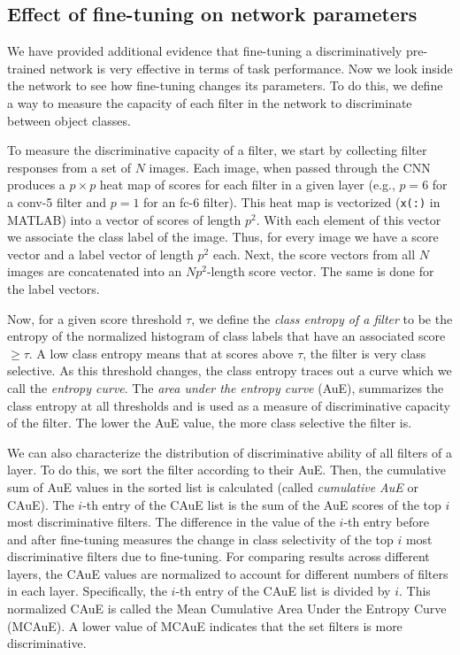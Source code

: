 \subsection{Effect of fine-tuning on network parameters}
\label{sub:fine-entropy}
We have provided additional evidence that fine-tuning a discriminatively pre-trained network is very effective in terms of task performance.
Now we look inside the network to see how fine-tuning changes its parameters.
To do this, we define a way to measure the capacity of each filter in the network to discriminate between object classes.

To measure the discriminative capacity of a filter, we start by collecting filter responses from a set of $N$ images.
Each image, when passed through the CNN produces a $p \times p$ heat map of scores for each filter in a given layer (e.g., $p = 6$ for a conv-5 filter and $p = 1$ for an fc-6 filter).
This heat map is vectorized (\texttt{x(:)} in MATLAB) into a vector of scores of length $p^2$. With each element of this vector we associate the class label of the image. 
Thus, for every image we have a score vector and a label vector of length $p^2$ each.
Next, the score vectors from all $N$ images are concatenated into an $Np^2$-length score vector.
The same is done for the label vectors.

Now, for a given score threshold $\tau$, we define the \emph{class entropy of a filter} to be the entropy of the normalized histogram of class labels that have an associated score $\geq \tau$.
A low class entropy means that at scores above $\tau$, the filter is very class selective.
As this threshold changes, the class entropy traces out a curve which we call the \emph{entropy curve}.
The \emph{area under the entropy curve} (AuE), summarizes the class entropy at all thresholds and is used as a measure of discriminative capacity of the filter. 
The lower the AuE value, the more class selective the filter is.

We can also characterize the distribution of discriminative ability of all filters of a layer.
To do this, we sort the filter according to their AuE.
Then, the cumulative sum of AuE values in the sorted list is calculated (called \emph{cumulative AuE} or CAuE). 
The $i$-th entry of the CAuE list is the sum of the AuE scores of the top $i$ most discriminative filters.
The difference in the value of the $i$-th entry before and after fine-tuning measures the change in class selectivity of the top $i$ most discriminative filters due to fine-tuning.
For comparing results across different layers, the CAuE values are normalized to account for different numbers of filters in each layer. 
Specifically, the $i$-th entry of the CAuE list is divided by $i$. 
This normalized CAuE is called the Mean Cumulative Area Under the Entropy Curve (MCAuE).
A lower value of MCAuE indicates that the set filters is more discriminative.

